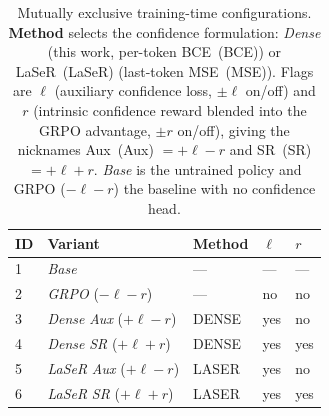 \documentclass[a4paper,oneside,10pt,english]{scrbook}
\DeclareRobustCommand{\acfit}[1]{\textit{\ac{#1}}}
\DeclareRobustCommand{\aclf}[1]{\acl{#1}~(\acs{#1})}
\begin{document}
\begin{table}[ht]
	\centering
	\caption[Training-time experimental variants]{Mutually exclusive training-time configurations. \textbf{Method} selects the confidence formulation: \textit{Dense} (this work, per-token \aclf{BCE}) or \aclf{LaSeR} (last-token \aclf{MSE}). Flags are $\ell$ (auxiliary confidence loss, $\pm\ell$ on/off) and $r$ (intrinsic confidence reward blended into the \acs{GRPO} advantage, $\pm r$ on/off), giving the nicknames \aclf{Aux} $=+\ell-r$ and \aclf{SR} $=+\ell+r$. \textit{Base} is the untrained policy and \acs{GRPO} ($-\ell-r$) the baseline with no confidence head.}
	\label{tab:variants:train}
	\begin{tabular}{lllll}
		\toprule
		\textbf{ID} & \textbf{Variant}                       & \textbf{Method} & \textbf{$\ell$} & \textbf{$r$} \\
		\midrule
		1           & \textit{Base}                          & ---             & ---             & ---          \\
		2           & \acfit{GRPO} ($-\ell-r$)               & ---             & no              & no           \\
		3           & \textit{Dense} \acfit{Aux} ($+\ell-r$) & DENSE           & yes             & no           \\
		4           & \textit{Dense} \acfit{SR} ($+\ell+r$)  & DENSE           & yes             & yes          \\
		5           & \acfit{LaSeR} \acfit{Aux} ($+\ell-r$)  & LASER           & yes             & no           \\
		6           & \acfit{LaSeR} \acfit{SR} ($+\ell+r$)   & LASER           & yes             & yes          \\
		\bottomrule
	\end{tabular}
\end{table}
\end{document}

